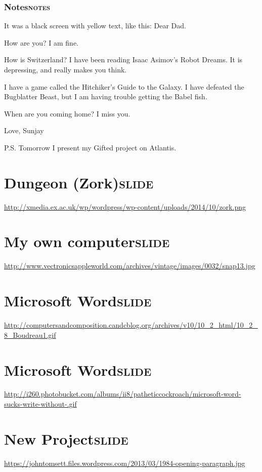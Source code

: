 \documentclass[11pt]{article}
\begin{document}
\subsubsection{Notes\hfill{}\textsc{notes}}
\label{sec:orgheadline6}

It was a black screen with yellow text, like this: 
Dear Dad.

How are you? I am fine.

How is Switzerland? I have been reading Isaac Asimov's Robot Dreams. It is depressing, and really makes you think. 

I have a game called the Hitchiker's Guide to the Galaxy. I have defeated the Bugblatter Beast, but I am having trouble getting the Babel fish. 

When are you coming home? I miss you. 

Love,
Sunjay

P.S. Tomorrow I present my Gifted project on Atlantis. 

\section{Dungeon (Zork)\hfill{}\textsc{slide}}
\label{sec:orgheadline8}
\url{http://xmedia.ex.ac.uk/wp/wordpress/wp-content/uploads/2014/10/zork.png} 

\section{My own computer\hfill{}\textsc{slide}}
\label{sec:orgheadline9}
\url{http://www.vectronicsappleworld.com/archives/vintage/images/0032/snap13.jpg} 

\section{Microsoft Word\hfill{}\textsc{slide}}
\label{sec:orgheadline10}
\url{http://computersandcomposition.candcblog.org/archives/v10/10_2_html/10_2_8_Boudreau1.gif} 

\section{Microsoft Word\hfill{}\textsc{slide}}
\label{sec:orgheadline11}
\url{http://i260.photobucket.com/albums/ii8/patheticcockroach/microsoft-word-sucks-write-without-.gif} 

\section{New Project\hfill{}\textsc{slide}}
\label{sec:orgheadline12}
\url{https://johntomsett.files.wordpress.com/2013/03/1984-opening-paragraph.jpg} 
\end{document}
